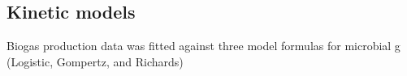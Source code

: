 \subsection{Kinetic models}
Biogas production data was fitted against three model formulas for microbial g (Logistic, Gompertz, and Richards)